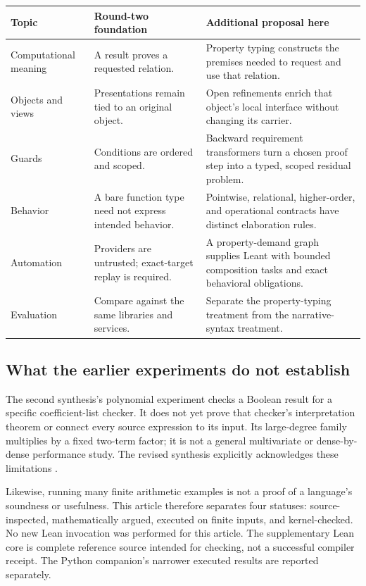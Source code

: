 \documentclass[11pt,a4paper]{article}
\theoremstyle{definition}
\begin{document}
\begin{center}\small
\begin{tabularx}{\textwidth}{@{}P{34mm}YY@{}}
\toprule
Topic & Round-two foundation & Additional proposal here\\
\midrule
Computational meaning & A result proves a requested relation. & Property typing
constructs the premises needed to request and use that relation.\\
Objects and views & Presentations remain tied to an original object. & Open
refinements enrich that object's local interface without changing its carrier.\\
Guards & Conditions are ordered and scoped. & Backward requirement transformers
turn a chosen proof step into a typed, scoped residual problem.\\
Behavior & A bare function type need not express intended behavior. & Pointwise,
relational, higher-order, and operational contracts have distinct elaboration rules.\\
Automation & Providers are untrusted; exact-target replay is required. & A
property-demand graph supplies Leant with bounded composition tasks and exact
behavioral obligations.\\
Evaluation & Compare against the same libraries and services. & Separate the
property-typing treatment from the narrative-syntax treatment.\\
\bottomrule
\end{tabularx}
\end{center}

\subsection{What the earlier experiments do not establish}
The second synthesis's polynomial experiment checks a Boolean result for a
specific coefficient-list checker. It does not yet prove that checker's
interpretation theorem or connect every source expression to its input. Its
large-degree family multiplies by a fixed two-term factor; it is not a general
multivariate or dense-by-dense performance study. The revised synthesis
explicitly acknowledges these limitations \cite[toolchain experiments and
parallel-synthesis discussion]{round2b}.

Likewise, running many finite arithmetic examples is not a proof of a language's
soundness or usefulness. This article therefore separates four statuses:
source-inspected, mathematically argued, executed on finite inputs, and
kernel-checked. No new Lean invocation was performed for this article. The
supplementary Lean core is complete reference source intended for checking,
not a successful compiler receipt. The Python companion's narrower executed
results are reported separately.
\end{document}
